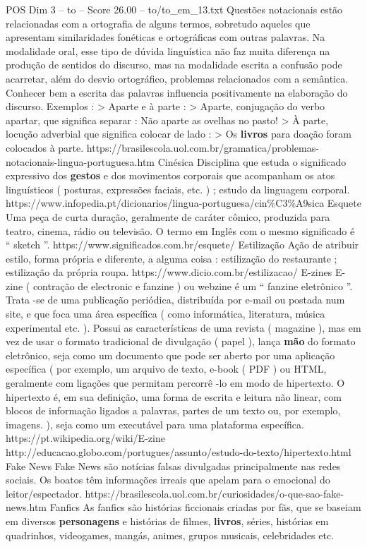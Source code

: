 \begin{textsample}{POS Dim 3 – to – Score 26.00 – to/to\_em\_13.txt}
Questões notacionais estão relacionadas com a ortografia de alguns termos, sobretudo aqueles que apresentam similaridades fonéticas e ortográficas com outras palavras.
Na modalidade oral, esse tipo de dúvida linguística não faz muita diferença na produção de sentidos do discurso, mas na modalidade escrita a confusão pode acarretar, além do desvio ortográfico, problemas relacionados com a semântica.
Conhecer bem a escrita das palavras influencia positivamente na elaboração do discurso.
Exemplos : > Aparte e à parte : > Aparte, conjugação do verbo apartar, que significa separar : Não aparte as ovelhas no pasto! > À parte, locução adverbial que significa colocar de lado : > Os \textbf{livros} para doação foram colocados à parte. https://brasilescola.uol.com.br/gramatica/problemas-notacionais-lingua-portuguesa.htm Cinésica Disciplina que estuda o significado expressivo dos \textbf{gestos} e dos movimentos corporais que acompanham os atos linguísticos ( posturas, expressões faciais, etc. ) ; estudo da linguagem corporal. https://www.infopedia.pt/dicionarios/lingua-portuguesa/cin\%C3\%A9sica Esquete Uma peça de curta duração, geralmente de caráter cômico, produzida para teatro, cinema, rádio ou televisão.
O termo em Inglês com o mesmo significado é “ sketch ”. https://www.significados.com.br/esquete/ Estilização Ação de atribuir estilo, forma própria e diferente, a alguma coisa : estilização do restaurante ; estilização da própria roupa. https://www.dicio.com.br/estilizacao/ E-zines E-zine ( contração de electronic e fanzine ) ou webzine é um “ fanzine eletrônico ”.
Trata -se de uma publicação periódica, distribuída por e-mail ou postada num site, e que foca uma área específica ( como informática, literatura, música experimental etc. ).
Possui as características de uma revista ( magazine ), mas em vez de usar o formato tradicional de divulgação ( papel ), lança \textbf{mão} do formato eletrônico, seja como um documento que pode ser aberto por uma aplicação específica ( por exemplo, um arquivo de texto, e-book ( PDF ) ou HTML, geralmente com ligações que permitam percorrê -lo em modo de hipertexto.
O hipertexto é, em sua definição, uma forma de escrita e leitura não linear, com blocos de informação ligados a palavras, partes de um texto ou, por exemplo, imagens. ), seja como um executável para uma plataforma específica. https://pt.wikipedia.org/wiki/E-zine http://educacao.globo.com/portugues/assunto/estudo-do-texto/hipertexto.html Fake News Fake News são notícias falsas divulgadas principalmente nas redes sociais.
Os boatos têm informações irreais que apelam para o emocional do leitor/espectador. https://brasilescola.uol.com.br/curiosidades/o-que-sao-fake-news.htm Fanfics As fanfics são histórias ficcionais criadas por fãs, que se baseiam em diversos \textbf{personagens} e histórias de filmes, \textbf{livros}, séries, histórias em quadrinhos, videogames, mangás, animes, grupos musicais, celebridades etc.

\end{textsample}
